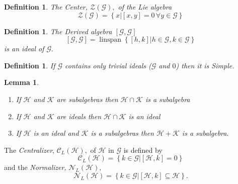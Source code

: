 \documentclass[aps,preprint]{revtex4}%
\newtheorem{definition}[theorem]{Definition}
\newtheorem{lemma}[theorem]{Lemma}
\begin{document}
\begin{definition}
The \emph{Center}, $\mathcal{Z}\left(  \mathcal{G}\right)  ,$ of the Lie
algebra
\begin{equation}
\mathcal{Z}\left(  \mathcal{G}\right)  =\left\{  \left.  x\right\vert \left[
x,y\right]  =0\,\forall y\in\mathcal{G}\right\}
\end{equation}

\end{definition}

\begin{definition}
The \emph{Derived algebra} $\left[  \mathcal{G},\mathcal{G}\right]  $
\begin{equation}
\left[  \mathcal{G},\mathcal{G}\right]  =\operatorname*{linspan}\left\{
\left.  \left[  h,k\right]  \right\vert h\in\mathcal{G},k\in\mathcal{G}%
\right\}
\end{equation}
is an ideal of $\mathcal{G}.$
\end{definition}

\begin{definition}
If $\mathcal{G}$ contains only trivial ideals ($\mathcal{G}$ and $0$) then it
is \emph{Simple.}
\end{definition}

\begin{lemma}
\begin{enumerate}
\item If $\mathcal{H}$ and $\mathcal{K}$ are subalgebras then $\mathcal{H}%
\cap\mathcal{K}$ is a subalgebra

\item If $\mathcal{H}$ and $\mathcal{K}$ are ideals then $\mathcal{H}%
\cap\mathcal{K}$ is an ideal

\item If $\mathcal{H}$ is an ideal and $\mathcal{K}$ is a subalgebras then
$\mathcal{H}+\mathcal{K}$ is a subalgebra$.$
\end{enumerate}
\end{lemma}

The \emph{Centralizer}, $\mathcal{C}_{L}\left(  \mathcal{H}\right)  ,$ of
$\mathcal{H}$ in $\mathcal{G}$ is defined by
\begin{equation}
\mathcal{C}_{L}\left(  \mathcal{H}\right)  =\left\{  \left.  k\in
\mathcal{G}\right\vert \left[  \mathcal{H},k\right]  =0\right\}
\end{equation}
and the \emph{Normalizer, }$\mathcal{N}_{L}\left(  \mathcal{H}\right)
,$\emph{ }%
\begin{equation}
\mathcal{N}_{L}\left(  \mathcal{H}\right)  =\left\{  \left.  k\in
\mathcal{G}\right\vert \left[  \mathcal{H},k\right]  \subseteq\mathcal{H}%
\right\}  .
\end{equation}
\end{document}
